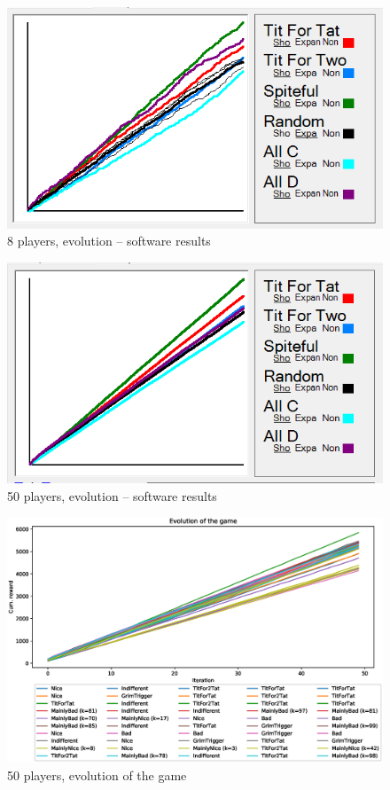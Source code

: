 \documentclass[journal,a4paper,10pt,twoside]{IEEEtran} %
\begin{document}
\begin{figure}[!ht]
    \centering
	\includegraphics[width=.9\columnwidth]{../img/ipdmp/ipdmp8-plot-det}
	\caption{8 players, evolution -- software results \cite{demosw}}
	\label{fig:boxIPDMPevo8sw}
\end{figure}

\begin{figure}[!ht]
    \centering
	\includegraphics[width=.9\columnwidth]{../img/ipdmp/ipdmp50-plot-det}
	\caption{50 players, evolution -- software results \cite{demosw}}
	\label{fig:boxIPDMPevo50sw}
\end{figure}

\begin{figure}[!ht]
    \centering
    \includegraphics[width=1\columnwidth]{../img/ipdmp/ipdmp-evolution-of-game-50}
    \caption{50 players, evolution of the game}
    \label{fig:boxIPDMPevo}
\end{figure}
\end{document}
